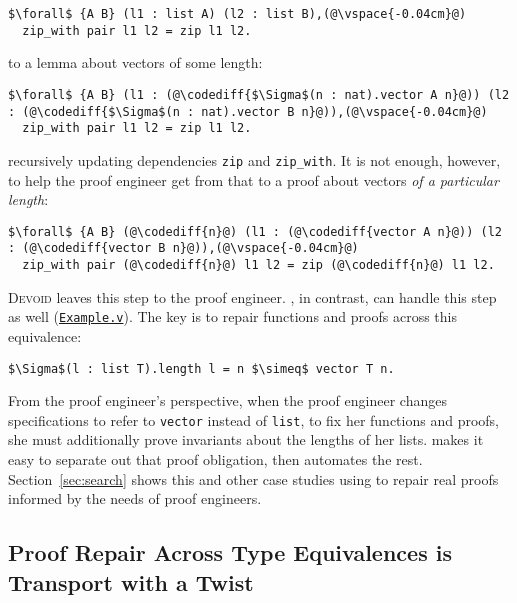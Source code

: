 \begin{lstlisting}
$\forall$ {A B} (l1 : list A) (l2 : list B),(@\vspace{-0.04cm}@)
  zip_with pair l1 l2 = zip l1 l2.
\end{lstlisting}
to a lemma about vectors of some length:

\begin{lstlisting}
$\forall$ {A B} (l1 : (@\codediff{$\Sigma$(n : nat).vector A n}@)) (l2 : (@\codediff{$\Sigma$(n : nat).vector B n}@)),(@\vspace{-0.04cm}@)
  zip_with pair l1 l2 = zip l1 l2.
\end{lstlisting}
recursively updating dependencies \lstinline{zip} and \lstinline{zip_with}.
It is not enough, however, to help the proof engineer get from that to a proof about vectors \textit{of a particular length}:

\begin{lstlisting}
$\forall$ {A B} (@\codediff{n}@) (l1 : (@\codediff{vector A n}@)) (l2 : (@\codediff{vector B n}@)),(@\vspace{-0.04cm}@)
  zip_with pair (@\codediff{n}@) l1 l2 = zip (@\codediff{n}@) l1 l2.
\end{lstlisting}

\textsc{Devoid} leaves this step to the proof engineer.
\toolname, in contrast, can handle this step as well (\href{https://github.com/uwplse/pumpkin-pi/blob/master/plugin/coq/examples/Example.v}{\lstinline{Example.v}}).
The key is to repair functions and proofs across this equivalence:

\begin{lstlisting}
$\Sigma$(l : list T).length l = n $\simeq$ vector T n.
\end{lstlisting}
From the proof engineer's perspective, when the proof engineer changes specifications to refer to \lstinline{vector} instead of \lstinline{list},
to fix her functions and proofs, she must additionally prove invariants about the lengths of her lists.
\toolname makes it easy to separate out that proof obligation, then automates the rest.
Section~\ref{sec:search} shows this and other case studies using \toolname to repair real proofs
informed by the needs of proof engineers.


\subsection{Proof Repair Across Type Equivalences is Transport with a Twist}
\label{sec:repair}


